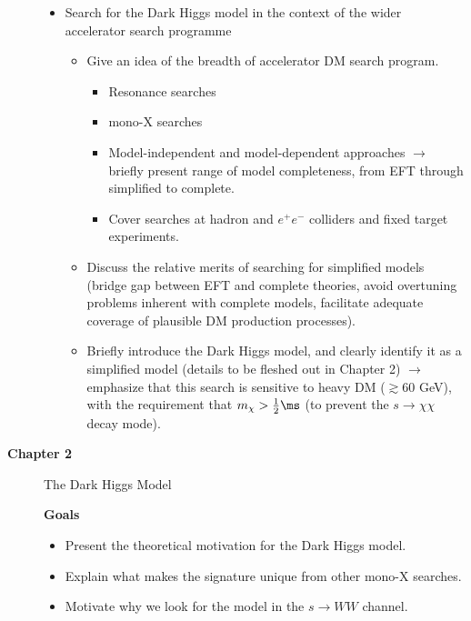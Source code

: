 \begin{description}
\begin{itemize}
\item Search for the Dark Higgs model in the context of the wider accelerator search programme
\begin{itemize}
\item Give an idea of the breadth of accelerator DM search program.
\begin{itemize}
\item Resonance searches
\item mono-X searches
\item Model-independent and model-dependent approaches $\rightarrow$ briefly present range of model completeness, from EFT through simplified to complete.
\item Cover searches at hadron and $e^+e^-$ colliders and fixed target experiments.
\end{itemize}
\item Discuss the relative merits of searching for simplified models (bridge gap between EFT and complete theories, avoid overtuning problems inherent with complete models, facilitate adequate coverage of plausible DM production processes).
\item Briefly introduce the Dark Higgs model, and clearly identify it as a simplified model (details to be fleshed out in Chapter 2) $\rightarrow$ emphasize that this search is sensitive to heavy DM ($\gtrsim$60 GeV), with the requirement that $m_\chi>\frac{1}{2}\ms$ (to prevent the $s\rightarrow\chi\chi$ decay mode).
\end{itemize}
\end{itemize}

\item[\textbf{Chapter 2}] The Dark Higgs Model

\textbf{Goals}
\begin{itemize}
\item Present the theoretical motivation for the Dark Higgs model.
\item Explain what makes the signature unique from other mono-X searches.
\item Motivate why we look for the model in the $s\rightarrow WW$ channel.
\end{itemize}


\end{description}
